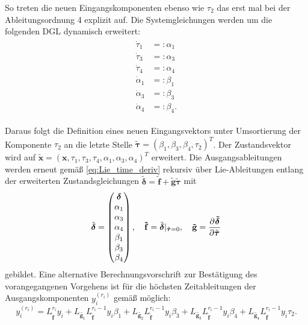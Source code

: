 So treten die neuen Eingangskomponenten ebenso wie $\tau_2$ das erst mal bei der Ableitungsordnung 4 explizit auf. Die Systemgleichungen werden um die folgenden DGL dynamisch erweitert:
\begin{align}
	\begin{split}
		\dot{\tau}_1 &=: \alpha_1 \\
		\dot{\tau}_3 &=: \alpha_3 \\
		\dot{\tau}_4 &=: \alpha_4 \\
		\dot{\alpha}_1 &=: \beta_1 \\
		\dot{\alpha}_3 &=: \beta_3 \\
		\dot{\alpha}_4 &=: \beta_4 .
	\end{split}
\end{align}

Daraus folgt die Definition eines neuen Eingangsvektors unter Umsortierung der Komponente $\tau_2$ an die letzte Stelle $\tilde{\boldsymbol{\tau}} = (\beta_1,  \beta_3,  \beta_4, \tau_2)^T$. Der Zustandsvektor wird auf $\tilde{\mathbf{x}} = (\mathbf{x}, \tau_1, \tau_3, \tau_4, \alpha_1, \alpha_3, \alpha_4)^T$ erweitert. Die Ausgangsableitungen werden erneut gemäß \eqref{eq:Lie_time_deriv} rekursiv über Lie-Ableitungen entlang der erweiterten Zustandsgleichungen  $\tilde{\boldsymbol{\delta}} = \mathbf{\tilde{f}} + \mathbf{\tilde{g}} \tilde{\boldsymbol{\tau}}$ mit
\begin{align}
	\tilde{\boldsymbol{\delta}} =
	\left(\begin{matrix}
		\boldsymbol{\delta} \\
		\alpha_1 \\
		\alpha_3 \\
		\alpha_4 \\
		\beta_1 \\
		\beta_3 \\
		\beta_4 \\	
	\end{matrix}\right), \quad
	\mathbf{\tilde{f}} = \tilde{\boldsymbol{\delta}}|_{\tilde{\boldsymbol{\tau}} = 0}, \quad
	\mathbf{\tilde{g}} = \frac{\partial^{}\boldsymbol{\tilde{\delta}}}{\partial{\tilde{\boldsymbol{\tau}}}^{}}
\end{align}
gebildet. Eine alternative Berechnungsvorschrift zur Bestätigung des vorangegangenen Vorgehens ist für die höchsten Zeitableitungen der Ausgangskomponenten $y_i^{(r_i)}$ gemäß \cite[S. 195]{NLRT_Roebenack} möglich:
\begin{equation}
	y_i^{(r_i)} = L_{\tilde{\mathbf{f}}}^{r_i} y_i + L_{\tilde{\mathbf{g}_1}} L_{\tilde{\mathbf{f}}}^{r_i-1} y_i \beta_1 + L_{\tilde{\mathbf{g}_2}} L_{\tilde{\mathbf{f}}}^{r_i-1} y_i \beta_3 + L_{\tilde{\mathbf{g}_3}} L_{\tilde{\mathbf{f}}}^{r_i-1} y_i \beta_4 + L_{\tilde{\mathbf{g}_4}} L_{\tilde{\mathbf{f}}}^{r_i-1} y_i \tau_2 .
\end{equation}

